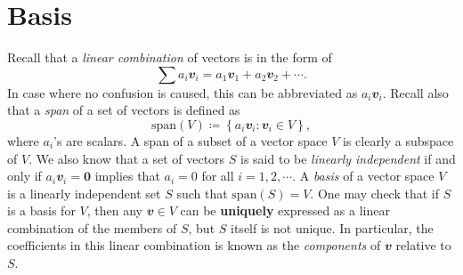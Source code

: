 \documentclass[math, code]{amznotes}
\theoremstyle{remark}
\newcommand{\zero}{\mathbf{0}}
\begin{document}
\section{Basis}
Recall that a \textit{linear combination} of vectors is in the form of
\begin{equation*}
    \sum a_i\mathbfit{v}_i = a_1\mathbfit{v}_1 + a_2\mathbfit{v}_2 + \cdots.
\end{equation*}
In case where no confusion is caused, this can be abbreviated as $a_i\mathbfit{v}_i$. Recall also that a \textit{span} of a set of vectors is defined as
\begin{equation*}
    \mathrm{span}(V) \coloneqq \left\{a_i\mathbfit{v}_i \colon \mathbfit{v}_i \in V\right\},
\end{equation*}
where $a_i$'s are scalars. A span of a subset of a vector space $V$ is clearly a subspace of $V$. We also know that a set of vectors $S$ is said to be \textit{linearly independent} if and only if  $a_i\mathbfit{v}_i = \zero$ implies that $a_i = 0$ for all $i = 1, 2, \cdots$. A \textit{basis} of a vector space $V$ is a linearly independent set $S$ such that $\mathrm{span}(S) = V$. One may check that if $S$ is a basis for $V$, then any $\mathbfit{v} \in V$ can be \textbf{uniquely} expressed as a linear combination of the members of $S$, but $S$ itself is not unique. In particular, the coefficients in this linear combination is known as the \textit{components} of $\mathbfit{v}$ relative to $S$.
\end{document}

